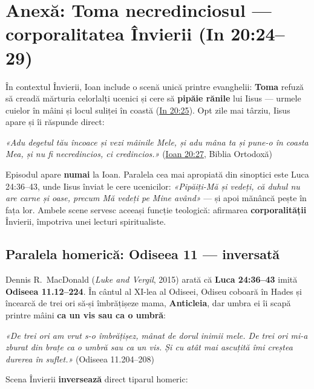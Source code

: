 \documentclass[12pt,a4paper,twoside,openany]{book}
\begin{document}
\chapter{Anexă: Toma necredinciosul — corporalitatea Învierii (In 20:24--29)}\label{toma}

În contextul Învierii, Ioan include o scenă unică printre evanghelii: \textbf{Toma} refuză să creadă mărturia celorlalți ucenici și cere să \textbf{pipăie rănile} lui Iisus --- urmele cuielor în mâini și locul suliței în coastă (\href{https://bibliaortodoxa.ro/carte.php?id=35\&cap=20\#25}{In 20:25}). Opt zile mai târziu, Iisus apare și îi răspunde direct:

\begin{biblequote}
\textit{«Adu degetul tău încoace și vezi mâinile Mele, și adu mâna ta și pune-o în coasta Mea, și nu fi necredincios, ci credincios.»} (\href{https://bibliaortodoxa.ro/carte.php?id=35\&cap=20\#27}{Ioan 20:27}, Biblia Ortodoxă)
\end{biblequote}

Episodul apare \textbf{numai} la Ioan. Paralela cea mai apropiată din sinoptici este Luca 24:36--43, unde Iisus înviat le cere ucenicilor: \textit{«Pipăiți-Mă și vedeți, că duhul nu are carne și oase, precum Mă vedeți pe Mine având»} --- și apoi mănâncă pește în fața lor. Ambele scene servesc aceeași funcție teologică: afirmarea \textbf{corporalității} Învierii, împotriva unei lecturi spiritualiste.

\section{Paralela homerică: Odiseea 11 --- inversată}

Dennis R.~MacDonald (\textit{Luke and Vergil}, 2015) arată că \textbf{Luca 24:36--43} imită \textbf{Odiseea 11.12--224}. În cântul al XI-lea al Odiseei, Odiseu coboară în Hades și încearcă de trei ori să-și îmbrățișeze mama, \textbf{Anticleia}, dar umbra ei îi scapă printre mâini \textbf{ca un vis sau ca o umbră}:

\begin{biblequote}
\textit{«De trei ori am vrut s-o îmbrățișez, mânat de dorul inimii mele. De trei ori mi-a zburat din brațe ca o umbră sau ca un vis. Și cu atât mai ascuțită îmi creștea durerea în suflet.»} (Odiseea 11.204--208)
\end{biblequote}

Scena Învierii \textbf{inversează} direct tiparul homeric:
\end{document}
